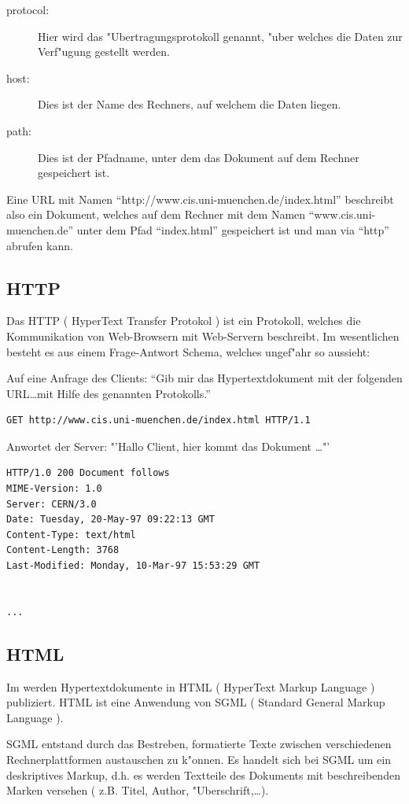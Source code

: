 \begin{description}
	\item[protocol:]	Hier wird das "Ubertragungsprotokoll genannt, "uber welches die Daten zur Verf"ugung gestellt werden.
	\item[host:]	Dies ist der Name des Rechners, auf welchem die Daten liegen.
	\item[path:]	Dies ist der Pfadname, unter dem das Dokument auf dem Rechner gespeichert ist.
\end{description}

Eine URL mit Namen "`http://www.cis.uni-muenchen.de/index.html"' beschreibt also ein Dokument, welches auf dem  Rechner mit dem Namen "`www.cis.uni-muenchen.de"' unter dem Pfad "`index.html"' gespeichert ist und man via "`http"' abrufen kann.


\subsection{HTTP}
Das HTTP ( HyperText Transfer Protokol ) ist ein Protokoll, welches die Kommunikation von Web-Browsern mit Web-Servern beschreibt. Im wesentlichen besteht es aus einem Frage-Antwort Schema, welches ungef"ahr so aussieht:

Auf eine Anfrage des Clients: "`Gib mir das Hypertextdokument mit der folgenden URL\dots mit Hilfe des genannten Protokolls."'
\begin{verbatim}
GET http://www.cis.uni-muenchen.de/index.html HTTP/1.1
\end{verbatim}
Anwortet der Server: "'Hallo Client, hier kommt das Dokument \dots"'
\begin{verbatim}
HTTP/1.0 200 Document follows
MIME-Version: 1.0
Server: CERN/3.0
Date: Tuesday, 20-May-97 09:22:13 GMT
Content-Type: text/html
Content-Length: 3768
Last-Modified: Monday, 10-Mar-97 15:53:29 GMT


...
\end{verbatim}


\subsection{HTML}
Im \www werden Hypertextdokumente in HTML ( HyperText Markup Language ) publiziert. HTML ist eine Anwendung von SGML ( Standard General Markup Language ).

SGML entstand durch das Bestreben, formatierte Texte zwischen verschiedenen Rechnerplattformen austauschen zu k"onnen. Es handelt sich bei SGML um ein deskriptives Markup, d.h. es werden Textteile des Dokuments mit beschreibenden Marken versehen ( z.B. Titel, Author, "Uberschrift,\dots ).



